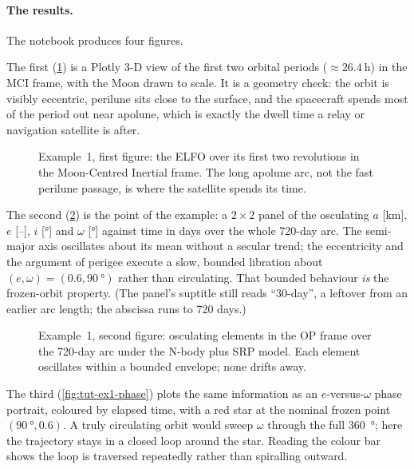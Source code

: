 \paragraph{The results.}
The notebook produces four figures.

The first (\cref{fig:tut-ex1-orbit}) is a Plotly 3-D view of the first two
orbital periods ($\approx\SI{26.4}{\hour}$) in the MCI frame, with the Moon
drawn to scale. It is a geometry check: the orbit is visibly eccentric, perilune
sits close to the surface, and the spacecraft spends most of the period out near
apolune, which is exactly the dwell time a relay or navigation satellite is
after.

\begin{figure}[htbp]
  \centering
  \caption{Example~1, first figure: the ELFO over its first two revolutions in
           the Moon-Centred Inertial frame. The long apolune arc, not the fast
           perilune passage, is where the satellite spends its time.}
  \label{fig:tut-ex1-orbit}
\end{figure}

The second (\cref{fig:tut-ex1-coe}) is the point of the example: a
$2\times2$ panel of the osculating $a$ [\si{\kilo\meter}], $e$ [--],
$i$ [\si{\degree}] and $\omega$ [\si{\degree}] against time in days over the
whole 720-day arc. The semi-major axis oscillates about its mean without a
secular trend; the eccentricity and the argument of perigee execute a slow,
bounded libration about $(e,\omega)=(0.6,\SI{90}{\degree})$ rather than
circulating. That bounded behaviour \emph{is} the frozen-orbit property. (The
panel's suptitle still reads ``30-day'', a leftover from an earlier arc length;
the abscissa runs to 720 days.)

\begin{figure}[htbp]
  \centering
  \caption{Example~1, second figure: osculating elements in the OP frame over
           the 720-day arc under the N-body plus SRP model. Each element
           oscillates within a bounded envelope; none drifts away.}
  \label{fig:tut-ex1-coe}
\end{figure}

The third (\cref{fig:tut-ex1-phase}) plots the same information as an
$e$-versus-$\omega$ phase portrait, coloured by elapsed time, with a red star at
the nominal frozen point $(\SI{90}{\degree},0.6)$. A truly circulating orbit
would sweep $\omega$ through the full \SI{360}{\degree}; here the trajectory
stays in a closed loop around the star. Reading the colour bar shows the loop is
traversed repeatedly rather than spiralling outward.

